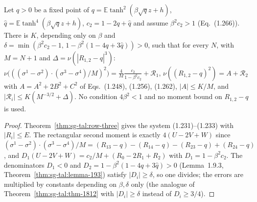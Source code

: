 \begin{theorem}
\label{thm:sg-tal:lemma-194}
  \leanok
{}
Let $q>0$ be a fixed point of $q=\mathbb E\tanh^2(\beta\sqrt qz+h)$, $\hat q=\mathbb E\tanh^4(\beta\sqrt qz+h)$, $c_2=1-2q+\hat q$ and assume
$\beta^2c_2>1$ (Eq.~(1.266)).  There is $K$, depending only on $\beta$ and $\delta=\min(\beta^2c_2-1,\,1-\beta^2(1-4q+3\hat q))>0$, such that for every $N$, with $M=N+1$ and $\Delta=\nu(|R_{1,2}-q|^3)$:
$\nu\bigl(((\sigma^1-\sigma^2)\cdot(\sigma^3-\sigma^4)/M)^2\bigr)=\frac4M\frac{c_2}{1-\beta^2c_2}+\mathcal R_1$,
$\nu((R_{1,2}-q)^2)=A+\mathcal R_2$ with $A=A^2+2B^2+C^2$ of Eqs.~(1.248), (1.256), (1.262), $|A|\le K/M$,
and $|\mathcal R_i|\le K(M^{-3/2}+\Delta)$.  No condition $4\beta^2<1$ and no moment bound on $R_{1,2}-q$ is used.
\end{theorem}
\begin{proof}
  \leanok
Theorem~\ref{thm:sg-tal:row-three} gives the system (1.231)--(1.233) with $|R_i|\le E$.  The rectangular second moment is exactly
$4(U-2V+W)$ since $(\sigma^1-\sigma^2)\cdot(\sigma^3-\sigma^4)/M=(R_{13}-q)-(R_{14}-q)-(R_{23}-q)+(R_{24}-q)$, and
$D_1(U-2V+W)=c_2/M+(R_0-2R_1+R_2)$ with $D_1=1-\beta^2c_2$.  The denominators $D_1<0$ and $D_2=1-\beta^2(1-4q+3\hat q)>0$ (Lemma~1.9.3,
Theorem~\ref{thm:sg-tal:lemma-193}) satisfy $|D_i|\ge\delta$, so one divides;
the errors are multiplied by constants depending on $\beta,\delta$ only (the analogue of Theorem~\ref{thm:sg-tal:thm-1812} with $|D_i|\ge\delta$ instead of $D_i\ge3/4$).
\end{proof}

